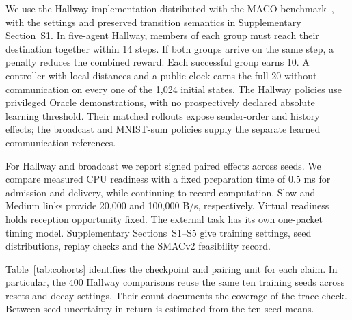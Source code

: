 \documentclass[a4paper,fleqn]{cas-dc}
\begin{document}
We use the Hallway implementation distributed with the MACO benchmark~\citep{wang2022casec}, with the settings and preserved transition semantics in Supplementary Section~S1. In five-agent Hallway, members of each group must reach their destination together within 14 steps. If both groups arrive on the same step, a penalty reduces the combined reward. Each successful group earns 10. A controller with local distances and a public clock earns the full 20 without communication on every one of the 1,024 initial states. The Hallway policies use privileged Oracle demonstrations, with no prospectively declared absolute learning threshold. Their matched rollouts expose sender-order and history effects; the broadcast and MNIST-sum policies supply the separate learned communication references.

For Hallway and broadcast we report signed paired effects across seeds. We compare measured CPU readiness with a fixed preparation time of 0.5 ms for admission and delivery, while continuing to record computation. Slow and Medium links provide 20,000 and 100,000 B/s, respectively. Virtual readiness holds reception opportunity fixed. The external task has its own one-packet timing model. Supplementary Sections~S1--S5 give training settings, seed distributions, replay checks and the SMACv2 feasibility record.

Table~\ref{tab:cohorts} identifies the checkpoint and pairing unit for each claim. In particular, the 400 Hallway comparisons reuse the same ten training seeds across resets and decay settings. Their count documents the coverage of the trace check. Between-seed uncertainty in return is estimated from the ten seed means.
\end{document}
